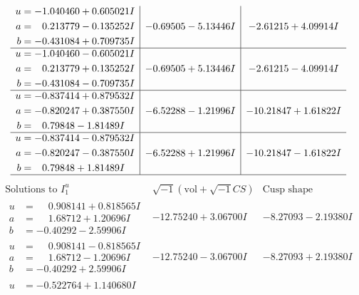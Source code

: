 \documentclass[1p]{elsarticle_modified}
\theoremstyle{definition}
\newcommand{\I}{\sqrt{-1}}
\begin{document}
$$\begin{array}{c|c|c}
\begin{aligned}
u &= -1.040460 + 0.605021 I \\
a &= \phantom{-}0.213779 - 0.135252 I \\
b &= -0.431084 + 0.709735 I\end{aligned}
 & -0.69505 - 5.13446 I & -2.61215 + 4.09914 I \\ \hline\begin{aligned}
u &= -1.040460 - 0.605021 I \\
a &= \phantom{-}0.213779 + 0.135252 I \\
b &= -0.431084 - 0.709735 I\end{aligned}
 & -0.69505 + 5.13446 I & -2.61215 - 4.09914 I \\ \hline\begin{aligned}
u &= -0.837414 + 0.879532 I \\
a &= -0.820247 + 0.387550 I \\
b &= \phantom{-}0.79848 - 1.81489 I\end{aligned}
 & -6.52288 - 1.21996 I & -10.21847 + 1.61822 I \\ \hline\begin{aligned}
u &= -0.837414 - 0.879532 I \\
a &= -0.820247 - 0.387550 I \\
b &= \phantom{-}0.79848 + 1.81489 I\end{aligned}
 & -6.52288 + 1.21996 I & -10.21847 - 1.61822 I\\
 \hline 
 \end{array}$$\newpage$$\begin{array}{c|c|c}  
\text{Solutions to }I^u_{1}& \I (\text{vol} + \sqrt{-1}CS) & \text{Cusp shape}\\
 \hline 
\begin{aligned}
u &= \phantom{-}0.908141 + 0.818565 I \\
a &= \phantom{-}1.68712 + 1.20696 I \\
b &= -0.40292 - 2.59906 I\end{aligned}
 & -12.75240 + 3.06700 I & -8.27093 - 2.19380 I \\ \hline\begin{aligned}
u &= \phantom{-}0.908141 - 0.818565 I \\
a &= \phantom{-}1.68712 - 1.20696 I \\
b &= -0.40292 + 2.59906 I\end{aligned}
 & -12.75240 - 3.06700 I & -8.27093 + 2.19380 I \\ \hline\begin{aligned}
u &= -0.522764 + 1.140680 I \\

\end{aligned}
\end{array}$$
\end{document}
